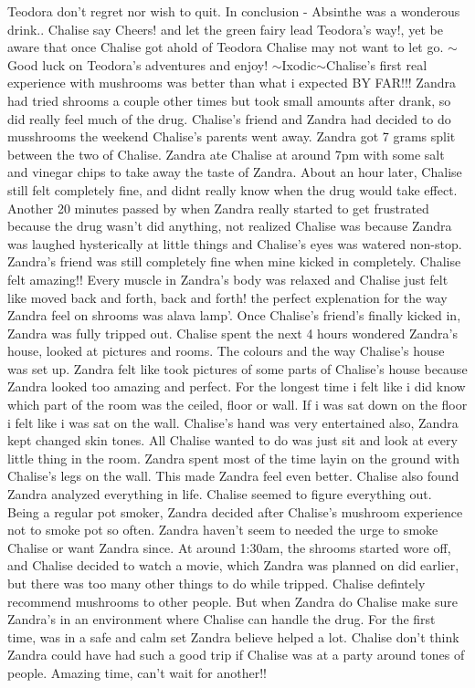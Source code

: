 \documentclass[12pt]{book}
\begin{document}
Teodora don't regret nor wish to quit. In conclusion - Absinthe was a wonderous drink.. Chalise say Cheers! and let the green fairy lead Teodora's way!, yet be aware that once Chalise got ahold of Teodora Chalise may not want to let go. $\sim$Good luck on Teodora's adventures and enjoy! $\sim$Ixodic$\sim$Chalise's first real experience with mushrooms was better than what i expected BY FAR!!! Zandra had tried shrooms a couple other times but took small amounts after drank, so did really feel much of the drug. Chalise's friend and Zandra had decided to do musshrooms the weekend Chalise's parents went away. Zandra got 7 grams split between the two of Chalise. Zandra ate Chalise at around 7pm with some salt and vinegar chips to take away the taste of Zandra. About an hour later, Chalise still felt completely fine, and didnt really know when the drug would take effect. Another 20 minutes passed by when Zandra really started to get frustrated because the drug wasn't did anything, not realized Chalise was because Zandra was laughed hysterically at little things and Chalise's eyes was watered non-stop. Zandra's friend was still completely fine when mine kicked in completely. Chalise felt amazing!! Every muscle in Zandra's body was relaxed and Chalise just felt like moved back and forth, back and forth! the perfect explenation for the way Zandra feel on shrooms was alava lamp'. Once Chalise's friend's finally kicked in, Zandra was fully tripped out. Chalise spent the next 4 hours wondered Zandra's house, looked at pictures and rooms. The colours and the way Chalise's house was set up. Zandra felt like took pictures of some parts of Chalise's house because Zandra looked too amazing and perfect. For the longest time i felt like i did know which part of the room was the ceiled, floor or wall. If i was sat down on the floor i felt like i was sat on the wall. Chalise's hand was very entertained also, Zandra kept changed skin tones. All Chalise wanted to do was just sit and look at every little thing in the room. Zandra spent most of the time layin on the ground with Chalise's legs on the wall. This made Zandra feel even better. Chalise also found Zandra analyzed everything in life. Chalise seemed to figure everything out. Being a regular pot smoker, Zandra decided after Chalise's mushroom experience not to smoke pot so often. Zandra haven't seem to needed the urge to smoke Chalise or want Zandra since. At around 1:30am, the shrooms started wore off, and Chalise decided to watch a movie, which Zandra was planned on did earlier, but there was too many other things to do while tripped. Chalise defintely recommend mushrooms to other people. But when Zandra do Chalise make sure Zandra's in an environment where Chalise can handle the drug. For the first time, was in a safe and calm set Zandra believe helped a lot. Chalise don't think Zandra could have had such a good trip if Chalise was at a party around tones of people. Amazing time, can't wait for another!!
\end{document}
